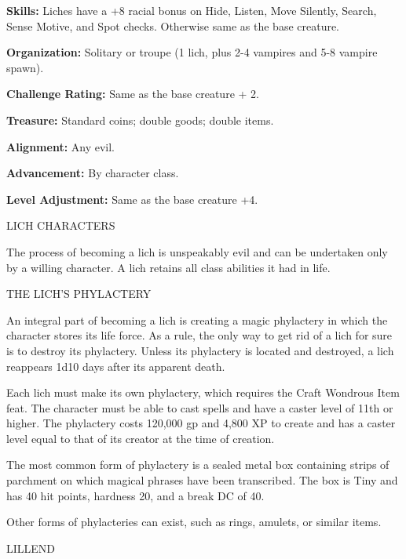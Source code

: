 \documentclass{article}
\begin{document}
\textbf{Skills:} Liches have a +8 racial bonus on Hide, Listen, Move Silently, 
Search, Sense Motive, and Spot checks. Otherwise same as the base creature.

\textbf{Organization:} Solitary or troupe (1 lich, plus 2-4 vampires and 5-8 vampire 
spawn).

\textbf{Challenge Rating:} Same as the base creature + 2.

\textbf{Treasure:} Standard coins; double goods; double items.

\textbf{Alignment:} Any evil.

\textbf{Advancement:} By character class.

\textbf{Level Adjustment:} Same as the base creature +4.

\vspace{12pt}
LICH CHARACTERS

The process of becoming a lich is unspeakably evil and can be undertaken only by 
a willing character. A lich retains all class abilities it had in life.

\vspace{12pt}
THE LICH'S PHYLACTERY

An integral part of becoming a lich is creating a magic phylactery in which the 
character stores its life force. As a rule, the only way to get rid of a lich for 
sure is to destroy its phylactery. Unless its phylactery is located and destroyed, 
a lich reappears 1d10 days after its apparent death.

Each lich must make its own phylactery, which requires the Craft Wondrous Item 
feat. The character must be able to cast spells and have a caster level of 11th 
or higher. The phylactery costs 120,000 gp and 4,800 XP to create and has a caster 
level equal to that of its creator at the time of creation.

The most common form of phylactery is a sealed metal box containing strips of parchment 
on which magical phrases have been transcribed. The box is Tiny and has 40 hit 
points, hardness 20, and a break DC of 40.

Other forms of phylacteries can exist, such as rings, amulets, or similar items.

\vspace{12pt}
{\LARGE{}LILLEND}
\end{document}
